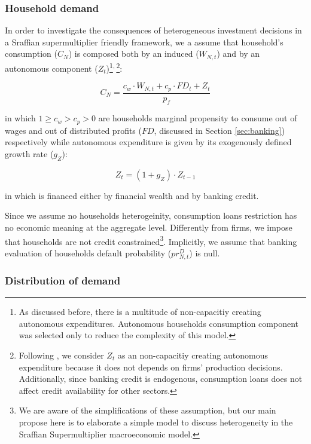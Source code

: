 \documentclass{SelfArx}
\begin{document}
\subsubsection{Household demand}
\label{sec:org9ae3517}


In order to investigate the consequences of heterogeneous investment decisions in a Sraffian supermultiplier friendly framework, we a assume that household's consumption (\(C_{N}\)) is composed both by an induced (\(W_{N,t}\)) and by an autonomous component (\(Z_{t}\))\footnote{As discussed before, there is a multitude of non-capacitiy creating autonomous expenditures. Autonomous households consumption component was selected only to reduce the complexity of this model.}\textsuperscript{,}\,\footnote{Following \textcite{serrano_1995_Long}, we consider \(Z_{t}\) as an non-capacitiy creating autonomous expenditure because it does not depends on firms' production decisions. Additionally, since banking credit is endogenous, consumption loans does not affect credit availability for other sectors.}:

\begin{latex}
\begin{equation}
C_{N} = \frac{c_{w}\cdot W_{N,t} + c_{p}\cdot FD_{t} + Z_{t}}{p_{f}}
\end{equation}
\end{latex}
in which \(1 \geq c_{w} > c_{p} > 0\) are households marginal propensity to consume out of wages and out of distributed profits (\(FD\), discussed in Section \ref{sec:banking}) respectively while autonomous expenditure is given by its exogenously defined growth rate (\(g_{Z}\)):
\begin{latex}
\begin{equation}
Z_{t} = (1+g_{Z})\cdot Z_{t-1}
\end{equation}
\end{latex}
in which is financed either by financial wealth and by banking credit.

Since we assume no households heterogeinity, consumption loans restriction has no economic meaning at the aggregate level.
Differently from firms, we impose that households are not credit constrained\footnote{We are aware of the simplifications of these assumption, but our main propose here is to elaborate a simple model to discuss heterogeneity in the Sraffian Supermultiplier macroeconomic model.}.
Implicitly, we assume that banking evaluation of households default probability (\(pr^{D}_{N,t}\)) is null.

\subsubsection{Distribution of demand}
\label{sec:orga791dd9}
\end{document}

